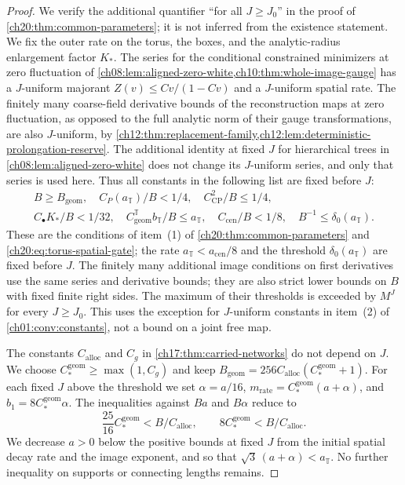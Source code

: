\begin{proof}
We verify the additional quantifier ``for all $J\ge J_0$'' in the proof of \cref{ch20:thm:common-parameters}; it is not inferred from the existence statement. We fix the outer rate on the torus, the boxes, and the analytic-radius enlargement factor $K_*$. The series for the conditional constrained minimizers at zero fluctuation of \cref{ch08:lem:aligned-zero-white,ch10:thm:whole-image-gauge} has a $J$-uniform majorant $Z(v)\le Cv/(1-Cv)$ and a $J$-uniform spatial rate. The finitely many coarse-field derivative bounds of the reconstruction maps at zero fluctuation, as opposed to the full analytic norm of their gauge transformations, are also $J$-uniform, by \cref{ch12:thm:replacement-family,ch12:lem:deterministic-prolongation-reserve}. The additional identity at fixed $J$ for hierarchical trees in \cref{ch08:lem:aligned-zero-white} does not change its $J$-uniform series, and only that series is used here. Thus all constants in the following list are fixed before $J$:
\begin{equation}\label{ch20:eq:pre-J-lower-bounds}
 \begin{gathered}
 B\ge B_{\mathrm{geom}},\quad C_P(a_{\mathbb T})/B<1/4,\quad C_{\mathrm{CP}}^2/B\le1/4,\\
 C_\bullet K_*/B<1/32,\quad C^{\mathbb T}_{\mathrm{geom}}b_{\mathbb T}/B\le a_{\mathbb T},\quad C_{\mathrm{cen}}/B<1/8,\quad B^{-1}\le\delta_0(a_{\mathbb T}).
 \end{gathered}
\end{equation}
These are the conditions of item~(1) of \cref{ch20:thm:common-parameters} and \eqref{ch20:eq:torus-spatial-gate}; the rate $a_{\mathbb T}<a_{\mathrm{cen}}/8$ and the threshold $\delta_0(a_{\mathbb T})$ are fixed before $J$. The finitely many additional image conditions on first derivatives use the same series and derivative bounds; they are also strict lower bounds on $B$ with fixed finite right sides. The maximum of their thresholds is exceeded by $M^J$ for every $J\ge J_0$. This uses the exception for $J$-uniform constants in item~(2) of \cref{ch01:conv:constants}, not a bound on a joint free map.

The constants $C_{\mathrm{alloc}}$ and $C_g$ in \cref{ch17:thm:carried-networks} do not depend on $J$. We choose $C^{\mathrm{geom}}_*\ge\max(1,C_g)$ and keep $B_{\mathrm{geom}}=256C_{\mathrm{alloc}}(C^{\mathrm{geom}}_*+1)$. For each fixed $J$ above the threshold we set $\alpha=a/16$, $m_{\mathrm{rate}}=C^{\mathrm{geom}}_*(a+\alpha)$, and $b_1=8C^{\mathrm{geom}}_*\alpha$. The inequalities against $Ba$ and $B\alpha$ reduce to
\[
 \frac{25}{16}C^{\mathrm{geom}}_*<B/C_{\mathrm{alloc}},\qquad 8C^{\mathrm{geom}}_*<B/C_{\mathrm{alloc}}.
\]
We decrease $a>0$ below the positive bounds at fixed $J$ from the initial spatial decay rate and the image exponent, and so that $\sqrt3\,(a+\alpha)<a_{\mathbb T}$. No further inequality on supports or connecting lengths remains.


\end{proof}
